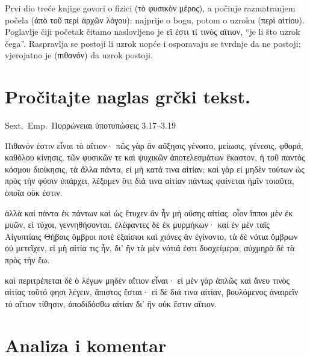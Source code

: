 Prvi dio treće knjige govori o fizici \textgreek[variant=ancient]{(τὸ φυσικὸν μέρος)}, a počinje razmatranjem počela \textgreek[variant=ancient]{(ἀπὸ τοῦ περὶ ἀρχῶν λόγου)}: najprije o bogu, potom o uzroku \textgreek[variant=ancient]{(περὶ αἰτίου).} Poglavlje čiji početak čitamo naslovljeno je \textgreek[variant=ancient]{εἴ ἐστι τί τινὸς αἴτιον,} ``je li što uzrok čega''. Raspravlja se postoji li uzrok uopće i osporavaju se tvrdnje da ne postoji; vjerojatno je \textgreek[variant=ancient]{(πιθανόν)} da uzrok postoji.



\section*{Pročitajte naglas grčki tekst.}

Sext.\ Emp.\ Πυρρώνειαι ὑποτυπώσεις 3.17–3.19


\medskip


{\large

\begin{greek}

\noindent  Πιθανόν ἐστιν εἶναι τὸ αἴτιον· πῶς γὰρ ἂν αὔξησις γένοιτο, μείωσις, γένεσις, φθορά, καθόλου κίνησις, τῶν φυσικῶν τε καὶ ψυχικῶν ἀποτελεσμάτων ἕκαστον, ἡ τοῦ παντὸς κόσμου διοίκησις, τὰ ἄλλα πάντα, εἰ μὴ κατά τινα αἰτίαν; καὶ γὰρ εἰ μηδὲν τούτων ὡς πρὸς τὴν φύσιν ὑπάρχει, λέξομεν ὅτι διά τινα αἰτίαν πάντως φαίνεται ἡμῖν τοιαῦτα, ὁποῖα οὔκ ἐστιν.

\noindent  ἀλλὰ καὶ πάντα ἐκ πάντων καὶ ὡς ἔτυχεν ἂν ἦν μὴ οὔσης αἰτίας. οἷον ἵπποι μὲν ἐκ μυῶν, εἰ τύχοι, γεννηθήσονται, ἐλέφαντες δὲ ἐκ μυρμήκων· καὶ ἐν μὲν ταῖς Αἰγυπτίαις Θήβαις ὄμβροι ποτὲ ἐξαίσιοι καὶ χιόνες ἂν ἐγίνοντο, τὰ δὲ νότια ὄμβρων οὐ μετεῖχεν, εἰ μὴ αἰτία τις ἦν, δι’ ἣν τὰ μὲν νότιά ἐστι δυσχείμερα, αὐχμηρὰ δὲ τὰ πρὸς τὴν ἔω.

\noindent  καὶ περιτρέπεται δὲ ὁ λέγων μηδὲν αἴτιον εἶναι· εἰ μὲν γὰρ ἁπλῶς καὶ ἄνευ τινὸς αἰτίας τοῦτό φησι λέγειν, ἄπιστος ἔσται· εἰ δὲ διά τινα αἰτίαν, βουλόμενος ἀναιρεῖν τὸ αἴτιον τίθησιν, ἀποδιδόσθω αἰτίαν δι’ ἣν οὐκ ἔστιν αἴτιον.

\end{greek}

}


\section*{Analiza i komentar}

